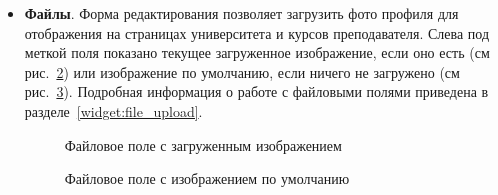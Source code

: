 \begin{itemize}
Видимость преподавателя на сайте настраивается путем переключения значения поля . Неопубликованные преподаватели скрыты на сайте для пользователей. В форме в списке преподавателей показываются как скрытые, так и опубликованные преподаватели. В зависимости от статуса их ФИО имеют различный цвет, подробное описание можно получить, нажав на иконку  рядом с меткой поля (см. рис.~\ref{instructor:edit_instructors_legend}).
		
		\begin{figure}[H]
		\caption{Справка о статусе преподавателей}
		\label{instructor:edit_instructors_legend}
		\end{figure}	
		
		\item \textbf{Файлы}. Форма редактирования позволяет загрузить фото профиля для отображения на страницах университета  и курсов преподавателя. Слева под меткой поля показано текущее загруженное изображение, если оно есть (см рис.~\ref{instructor:edit_logo}) или изображение по умолчанию, если ничего не загружено (см рис.~\ref{instructor:edit_icon_image}). Подробная информация о работе с файловыми полями приведена в разделе~\ref{widget:file_upload}.
		
		\begin{figure}[H]
		\caption{Файловое поле с загруженным изображением}
		\label{instructor:edit_logo}
		\end{figure}	
		
		\begin{figure}[H]
		\caption{Файловое поле с изображением по умолчанию}
		\label{instructor:edit_icon_image}
		\end{figure}
\end{itemize}

